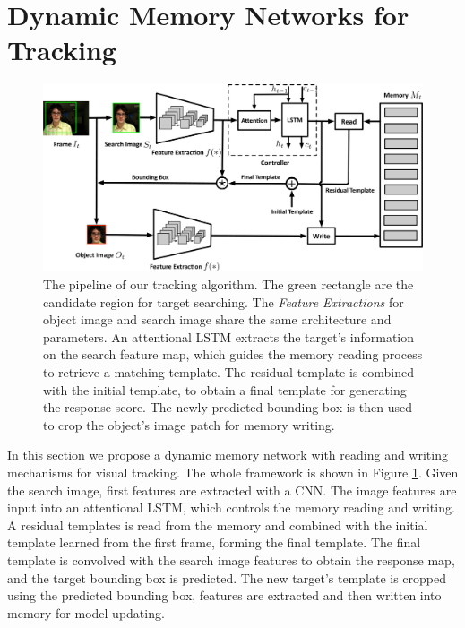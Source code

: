 \documentclass[runningheads]{llncs}
\begin{document}
\section{Dynamic Memory Networks for Tracking}

\begin{figure}[t]
	\begin{center}
		\includegraphics[width=0.95\linewidth]{figs/framework.pdf}
	\end{center}
	\caption{The pipeline of our tracking algorithm. The green rectangle are the candidate region for target searching. The \textit{Feature Extractions} for object image and search image share the same architecture and parameters. An attentional LSTM extracts the target's information on the search feature map, which guides the memory reading process to retrieve a matching template.  The residual  template is combined with the initial template, to obtain a final template for generating the response score. The newly predicted bounding box is then used to crop the object's image patch for memory writing. 
	}
	\label{fig:2}
\end{figure}

In this section we propose a dynamic memory network with reading and writing mechanisms for visual tracking. 
The whole framework is shown in Figure \ref{fig:2}.
Given the search image, first features are extracted with a CNN.
The image features are input into an attentional LSTM, which controls the memory reading and writing. 
A residual templates is read from the memory and combined with the initial template learned from the first frame, forming the final template.  The final template is convolved with the search image features to obtain the response map, and the target bounding box is predicted.
The new target's template is cropped using the predicted bounding box, features are extracted and then written into memory for model updating. 
\end{document}

